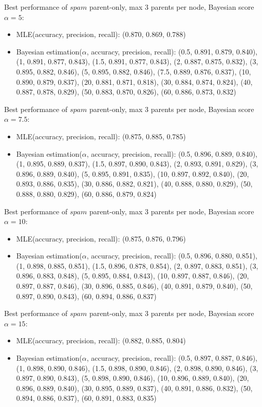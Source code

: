\documentclass[english,cover]{fitthesis} %
\begin{document}
{Best performance of $spam$ parent-only, max 3 parents per node, Bayesian score $\alpha=5$:
\begin{itemize}
    \item MLE(accuracy, precision, recall): (0.870, 0.869, 0.788)
    \item Bayesian estimation($\alpha$, accuracy, precision, recall): (0.5, 0.891, 0.879, 0.840), (1, 0.891, 0.877, 0.843), (1.5, 0.891, 0.877, 0.843), (2, 0.887, 0.875, 0.832), (3, 0.895, 0.882, 0.846), (5, 0.895, 0.882, 0.846), (7.5, 0.889, 0.876, 0.837), (10, 0.890, 0.879, 0.837), (20, 0.881, 0.871, 0.818), (30, 0.884, 0.874, 0.824), (40, 0.887, 0.878, 0.829), (50, 0.883, 0.870, 0.826), (60, 0.886, 0.873, 0.832)
\end{itemize}

Best performance of $spam$ parent-only, max 3 parents per node, Bayesian score $\alpha=7.5$:
\begin{itemize}
    \item MLE(accuracy, precision, recall): (0.875, 0.885, 0.785)
    \item Bayesian estimation($\alpha$, accuracy, precision, recall): (0.5, 0.896, 0.889, 0.840), (1, 0.895, 0.889, 0.837), (1.5, 0.897, 0.890, 0.843), (2, 0.893, 0.891, 0.829), (3, 0.896, 0.889, 0.840), (5, 0.895, 0.891, 0.835), (10, 0.897, 0.892, 0.840), (20, 0.893, 0.886, 0.835), (30, 0.886, 0.882, 0.821), (40, 0.888, 0.880, 0.829), (50, 0.888, 0.880, 0.829), (60, 0.886, 0.879, 0.824)
\end{itemize}

Best performance of $spam$ parent-only, max 3 parents per node, Bayesian score $\alpha=10$:
\begin{itemize}
    \item MLE(accuracy, precision, recall): (0.875, 0.876, 0.796)
    \item Bayesian estimation($\alpha$, accuracy, precision, recall): (0.5, 0.896, 0.880, 0.851), (1, 0.898, 0.885, 0.851), (1.5, 0.896, 0.878, 0.854), (2, 0.897, 0.883, 0.851), (3, 0.896, 0.883, 0.848), (5, 0.895, 0.884, 0.843), (10, 0.897, 0.887, 0.846), (20, 0.897, 0.887, 0.846), (30, 0.896, 0.885, 0.846), (40, 0.891, 0.879, 0.840), (50, 0.897, 0.890, 0.843), (60, 0.894, 0.886, 0.837)
\end{itemize}

Best performance of $spam$ parent-only, max 3 parents per node, Bayesian score $\alpha=15$:
\begin{itemize}
    \item MLE(accuracy, precision, recall): (0.882, 0.885, 0.804)
    \item Bayesian estimation($\alpha$, accuracy, precision, recall): (0.5, 0.897, 0.887, 0.846), (1, 0.898, 0.890, 0.846), (1.5, 0.898, 0.890, 0.846), (2, 0.898, 0.890, 0.846), (3, 0.897, 0.890, 0.843), (5, 0.898, 0.890, 0.846), (10, 0.896, 0.889, 0.840), (20, 0.896, 0.889, 0.840), (30, 0.895, 0.889, 0.837), (40, 0.891, 0.886, 0.832), (50, 0.894, 0.886, 0.837), (60, 0.891, 0.883, 0.835)
\end{itemize}

}
\end{document}
